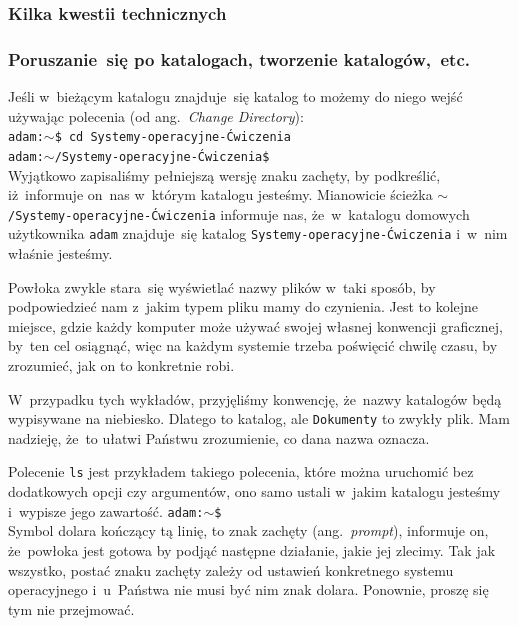\documentclass[10pt,t]{beamer}
\begin{document}








\begin{frame}
  \frametitle{Kilka kwestii technicznych}




\end{frame}





\begin{frame}
  \frametitle{Poruszanie~się po katalogach, tworzenie
    katalogów,~etc.}


  Jeśli w~bieżącym katalogu znajduje~się katalog
  to możemy do niego wejść
  używając polecenia
  (od ang.~\textit{Change Directory}): \\
  \texttt{adam:$\sim$\$ cd Systemy-operacyjne-Ćwiczenia} \\
  \texttt{adam:$\sim$/Systemy-operacyjne-Ćwiczenia\$} \\
  Wyjątkowo zapisaliśmy pełniejszą wersję znaku zachęty, by podkreślić,
  iż~informuje on~nas w~którym katalogu jesteśmy. Mianowicie ścieżka
  \texttt{$\sim$/Systemy-operacyjne-Ćwiczenia} informuje nas, że~w~katalogu
  domowych użytkownika \texttt{adam} znajduje~się katalog
  \texttt{Systemy-operacyjne-Ćwiczenia} i~w~nim właśnie jesteśmy.

  Powłoka zwykle stara~się wyświetlać nazwy plików w~taki sposób, by
  podpowiedzieć nam z~jakim typem pliku mamy do czynienia. Jest to kolejne
  miejsce, gdzie każdy komputer może używać swojej własnej konwencji
  graficznej, by~ten cel osiągnąć, więc na każdym systemie trzeba poświęcić
  chwilę czasu, by zrozumieć, jak on to konkretnie robi.

  W~przypadku tych wykładów, przyjęliśmy konwencję, że~nazwy katalogów
  będą wypisywane na niebiesko. Dlatego \texttt{}
  to katalog, ale \texttt{Dokumenty} to zwykły plik. Mam nadzieję, że~to
  ułatwi Państwu zrozumienie, co dana nazwa oznacza.



  Polecenie \texttt{ls} jest przykładem takiego polecenia, które można
  uruchomić bez dodatkowych opcji czy argumentów, ono samo ustali w~jakim
  katalogu jesteśmy i~wypisze jego zawartość.
  \texttt{adam:$\sim$\$} \\
  Symbol dolara kończący tą linię, to znak zachęty (ang.~\textit{prompt}),
  informuje on, że~powłoka jest gotowa by podjąć następne działanie, jakie
  jej zlecimy. Tak jak wszystko, postać znaku zachęty zależy od ustawień
  konkretnego systemu operacyjnego i~u~Państwa nie musi być nim znak dolara.
  Ponownie, proszę się tym nie przejmować.


\end{frame}
\end{document}
